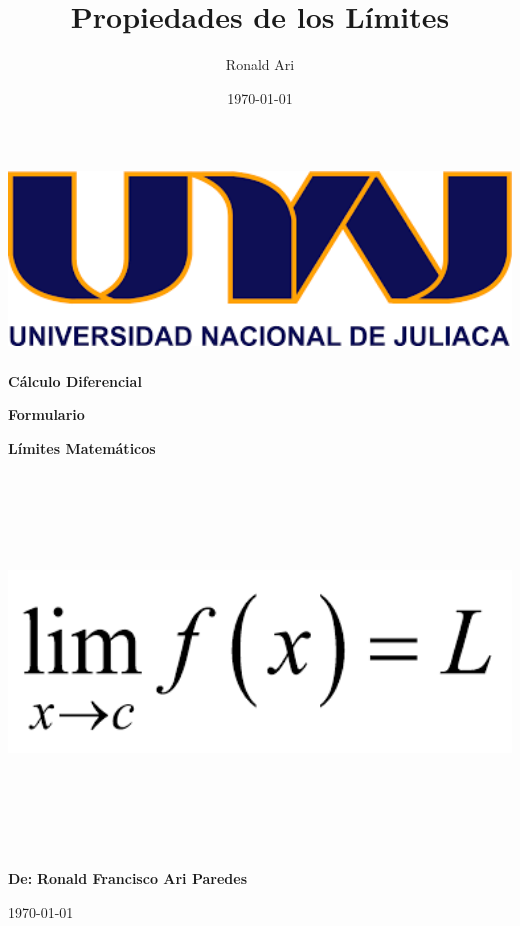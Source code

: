 \documentclass[12pt,a4paper]{article}
\author{Ronald Ari}
\title{Propiedades de los Límites }
\date{\today}
\begin{document}
    \begin{titlepage}
    \centering
    \includegraphics[width=\textwidth,height=5cm,keepaspectratio]{imagenes/logo_unaj.png}\par\vspace{1cm}
    {\Huge\textbf{Cálculo Diferencial}\par\vspace{0.4cm}}
    {\Huge\textbf{Formulario}\par\vspace{1cm}}
    {\Huge\bfseries\textcolor{violeta}{\textbf{Límites Matemáticos}}} \par\vspace{2cm}
    \includegraphics[width=\textwidth,height=10cm,keepaspectratio]{imagenes/limites.png}\par\vspace{1cm}
    \vfill{}
    \begin{tcolorbox}[colback=white!5!white,colframe=blue!75!black]
        \centering
        {\Huge\textbf{De:}} {\LARGE\textbf{Ronald Francisco Ari Paredes}}
    \end{tcolorbox}
    \vfill
    {\Large\today}
    \end{titlepage}
    \clearpage
\end{document}
